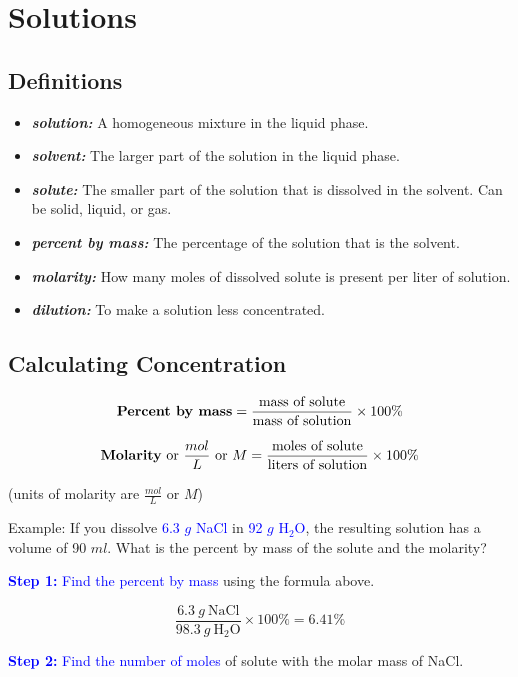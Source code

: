 \documentclass[a4paper, 12pt]{article}
\begin{document}
\section{Solutions}

\subsection{Definitions}

\begin{itemize}[leftmargin=*, nosep]
    \item \textbf{\textit{solution:}} A homogeneous mixture in the liquid phase.
    \item \textbf{\textit{solvent:}} The larger part of the solution in the liquid phase.
    \item \textbf{\textit{solute:}} The smaller part of the solution that is dissolved in the solvent. Can be solid, liquid, or gas.
    \item \textbf{\textit{percent by mass:}} The percentage of the solution that is the solvent.
    \item \textbf{\textit{molarity:}} How many moles of dissolved solute is present per liter of solution.
    \item \textbf{\textit{dilution:}} To make a solution less concentrated.
\end{itemize}

\subsection{Calculating Concentration}

$$ \text{\textbf{Percent by mass}} = \frac{\text{mass of solute}}{\text{mass of solution}} \times 100\%$$

$$ \text{\textbf{Molarity} or $\frac{mol}{L}$ or $M$} = \frac{\text{moles of solute}}{\text{liters of solution}} \times 100\%$$

(units of molarity are $\frac{mol}{L}$ or $M$)

Example: If you dissolve \textcolor{blue}{6.3 $g$ NaCl} in \textcolor{blue}{92 $g$ H$_2$O}, the resulting solution has a volume of 90 $ml$. What is the percent by mass of the solute and the molarity?

\textcolor{blue}{\textbf{Step 1:} Find the percent by mass} using the formula above.

$$\frac{6.3 \: g \: \text{NaCl}}{98.3 \: g \: \text{H$_2$O}} \times 100\% = 6.41 \%$$

\textcolor{blue}{\textbf{Step 2:} Find the number of moles} of solute with the molar mass of NaCl.
\end{document}
